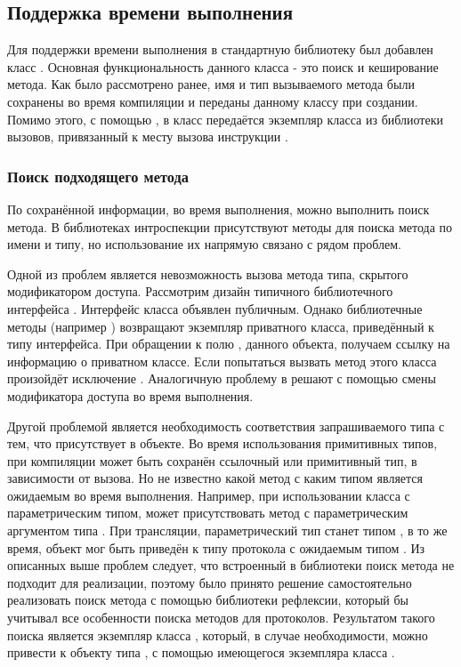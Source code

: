 \subsection{Поддержка времени выполнения} \label{runtime_info}
Для поддержки времени выполнения в стандартную библиотеку был добавлен класс . Основная функциональность данного класса - это поиск и кеширование метода. Как было рассмотрено ранее, имя и тип вызываемого метода были сохранены во время компиляции и переданы данному классу при создании. Помимо этого, с помощью , в класс передаётся экземпляр класса  из библиотеки вызовов, привязанный к месту вызова инструкции .

\subsubsection{Поиск подходящего метода}
По сохранённой информации, во время выполнения, можно выполнить поиск метода. В библиотеках интроспекции присутствуют методы для поиска метода по имени и типу, но использование их напрямую связано с рядом проблем.

Одной из проблем является невозможность вызова метода типа, скрытого модификатором доступа. Рассмотрим дизайн типичного библиотечного интерфейса . Интерфейс класса объявлен публичным. Однако библиотечные методы (например ) возвращают экземпляр приватного класса, приведённый к типу интерфейса. При обращении к полю , данного объекта, получаем ссылку на информацию о приватном классе. Если попытаться вызвать метод этого класса произойдёт исключение . Аналогичную проблему в  решают с помощью смены модификатора доступа во время выполнения.

Другой проблемой является необходимость соответствия запрашиваемого типа с тем, что присутствует в объекте. Во время использования примитивных типов, при компиляции может быть сохранён ссылочный или примитивный тип, в зависимости от вызова. Но не известно какой метод с каким типом является ожидаемым во время выполнения. Например, при использовании класса с параметрическим типом, может присутствовать метод с параметрическим аргументом типа . При трансляции, параметрический тип станет типом , в то же время, объект мог быть приведён к типу протокола с ожидаемым типом .
Из описанных выше проблем следует, что встроенный в библиотеки поиск метода не подходит для реализации, поэтому было принято решение самостоятельно реализовать поиск метода с помощью библиотеки рефлексии, который бы учитывал все особенности поиска методов для протоколов. Результатом такого поиска является экземпляр класса , который, в случае необходимости, можно привести к объекту типа , с помощью имеющегося экземпляра класса .

